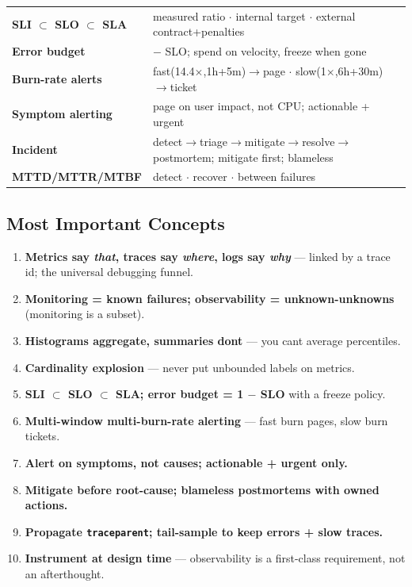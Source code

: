 \documentclass[11pt]{article}
\providecommand{\tightlist}{\setlength{\itemsep}{1pt}\setlength{\parskip}{0pt}}
\begin{document}
\begin{longtable}[]{@{}
  >{\raggedright\arraybackslash}p{}
  >{\raggedright\arraybackslash}p{}@{}}
\rowcolor{zebra}
\textbf{SLI \(\subset\) SLO \(\subset\) SLA} & measured ratio \(\cdot\) internal target \(\cdot\) external contract+penalties \\
\textbf{Error budget} & 1 \(-\) SLO; spend on velocity, freeze when gone \\
\rowcolor{zebra}
\textbf{Burn-rate alerts} & fast(14.4\(\times\),1h+5m)\(\rightarrow\)page \(\cdot\) slow(1\(\times\),6h+30m)\(\rightarrow\)ticket \\
\textbf{Symptom alerting} & page on user impact, not CPU; actionable + urgent \\
\rowcolor{zebra}
\textbf{Incident} & detect\(\rightarrow\)triage\(\rightarrow\)mitigate\(\rightarrow\)resolve\(\rightarrow\)postmortem; mitigate first; blameless \\
\textbf{MTTD/MTTR/MTBF} & detect \(\cdot\) recover \(\cdot\) between failures \\
\end{longtable}

\subsection{Most Important Concepts}\label{most-important-concepts}

\begin{enumerate}
\def\labelenumi{\arabic{enumi}.}
\tightlist
\item
  \textbf{Metrics say \emph{that}, traces say \emph{where}, logs say \emph{why}} --- linked by a trace id; the universal debugging funnel.
\item
  \textbf{Monitoring = known failures; observability = unknown-unknowns} (monitoring is a subset).
\item
  \textbf{Histograms aggregate, summaries don\textquotesingle t} --- you can\textquotesingle t average percentiles.
\item
  \textbf{Cardinality explosion} --- never put unbounded labels on metrics.
\item
  \textbf{SLI \(\subset\) SLO \(\subset\) SLA; error budget = 1 \(-\) SLO} with a freeze policy.
\item
  \textbf{Multi-window multi-burn-rate alerting} --- fast burn pages, slow burn tickets.
\item
  \textbf{Alert on symptoms, not causes; actionable + urgent only.}
\item
  \textbf{Mitigate before root-cause; blameless postmortems with owned actions.}
\item
  \textbf{Propagate \texttt{traceparent}; tail-sample to keep errors + slow traces.}
\item
  \textbf{Instrument at design time} --- observability is a first-class requirement, not an afterthought.
\end{enumerate}
\end{document}
